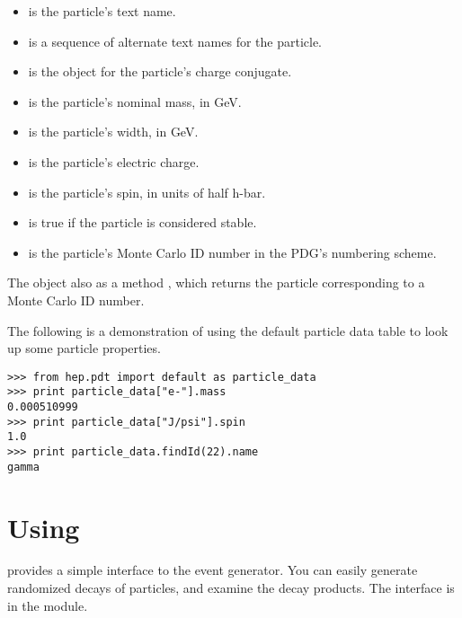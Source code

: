 \begin{itemize}

  \item {} is the particle's text name.

  \item {} is a sequence of alternate text names for the
  particle.

  \item {} is the  object for the
  particle's charge conjugate.

  \item {} is the particle's nominal mass, in GeV.

  \item {} is the particle's width, in GeV.

  \item {} is the particle's electric charge.

  \item {} is the particle's spin, in units of half h-bar.

  \item {} is true if the particle is considered
  stable. 

  \item {} is the particle's Monte Carlo ID number in the PDG's
  numbering scheme.

\end{itemize}

The  object also as a method , which returns
the particle corresponding to a Monte Carlo ID number.

The following is a demonstration of using the default particle data
table to look up some particle properties.
\begin{verbatim}
>>> from hep.pdt import default as particle_data
>>> print particle_data["e-"].mass
0.000510999
>>> print particle_data["J/psi"].spin
1.0
>>> print particle_data.findId(22).name
gamma
\end{verbatim}


\chapter{Using \evtgen}

\pyhep provides a simple interface to the \evtgen event generator.
You can easily generate randomized decays of particles, and examine the
decay products.  The \evtgen interface is in the 
module.

